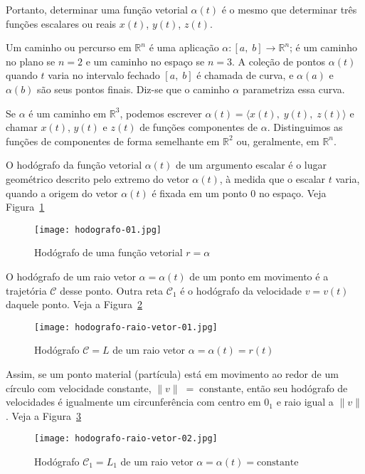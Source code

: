 Portanto, determinar uma função vetorial \(\alpha(t)\) é o mesmo que
determinar três funções escalares ou reais \(x(t)\), \(y(t)\), \(z(t)\).

Um caminho ou percurso em \(\mathbb{R}^{n}\) é uma aplicação \(\alpha \colon [a,\; b] \to  \mathbb{R}^{n}\); é um caminho no plano se \(n=2\) e um caminho no espaço se \(n = 3\). A coleção de pontos \(\alpha(t)\) quando \(t\) varia no intervalo fechado \([a,\; b]\) é chamada de curva, e \(\alpha(a)\) e \(\alpha(b)\) são seus pontos finais. Diz-se que o caminho \(\alpha\) parametriza essa curva.

Se \(\alpha\) é um caminho em \(\mathbb{R}^{3}\), podemos escrever \(\alpha(t) = \langle x(t),\; y (t),\; z (t)\rangle \) e chamar
\(x(t)\), \(y (t)\) e \(z(t)\) de funções componentes de \(\alpha\). Distinguimos as funções de componentes de forma semelhante em \(\mathbb{R}^{2}\) ou, geralmente, em \(\mathbb{R}^{n}\).

\begin{defi}[Hodógrafo]
O hodógrafo da função vetorial \(\alpha(t)\) de um argumento escalar é o lugar geométrico descrito pelo extremo do vetor \(\alpha(t)\), à medida que o escalar 
\(t\) varia, quando a origem do vetor \(\alpha(t)\) é fixada em um ponto \(0\) no espaço. Veja Figura~\ref{fig:1-1}
\end{defi}
\begin{figure}[H]
\centering
\texttt{[image: hodografo-01.jpg]}
\caption{Hodógrafo de uma função vetorial \(r=\alpha\)}
\label{fig:1-1}
\end{figure}

O hodógrafo de um raio vetor \(\alpha = \alpha(t)\) de um ponto em movimento é a trajetória \(\mathcal{C}\) desse ponto.
Outra reta \(\mathcal{C}_{1}\)  é o hodógrafo da velocidade \(v = v(t)\) daquele ponto. Veja a Figura~\ref{fig:1-2}
 \begin{figure}[H]
 	\centering
 	\texttt{[image: hodografo-raio-vetor-01.jpg]}
 	\caption{Hodógrafo \(\mathcal{C}=L\) de um raio vetor \(\alpha=\alpha(t)=r(t)\)}
 	\label{fig:1-2}
 \end{figure}

Assim, se um ponto material (partícula) está em movimento ao redor de um círculo com velocidade constante, \(\|v\|\; = \; \text{constante}\), então seu hodógrafo de velocidades é igualmente um circunferência com centro em \(0_{1}\) e raio igual a \(\|v\|\). Veja a Figura~\ref{fig:1-3}
 \begin{figure}[H]
	\centering
	\texttt{[image: hodografo-raio-vetor-02.jpg]}
	\caption{Hodógrafo \(\mathcal{C}_{1}=L_{1}\) de um raio vetor \(\alpha=\alpha(t)=\text{constante}\)}
	\label{fig:1-3}
\end{figure}



